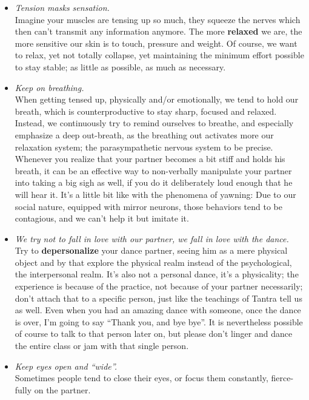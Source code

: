 \begin{itemize}
    \item [] \textit{Tension masks sensation.} \\
    Imagine your muscles are tensing up so much, they squeeze the nerves which then can't transmit any information anymore.
    The more \textbf{relaxed} we are, the more sensitive our skin is to touch, pressure and weight.
    Of course, we want to relax, yet not totally collapse, yet maintaining the minimum effort possible to stay stable; as little as possible, as much as necessary.
    \item [] \textit{Keep on breathing.} \\
    When getting tensed up, physically and/or emotionally, we tend to hold our breath, which is counterproductive to stay sharp, focused and relaxed.
    Instead, we continuously try to remind ourselves to breathe, and especially emphasize a deep out-breath, as the breathing out activates more our relaxation system; the parasympathetic nervous system to be precise.
    Whenever you realize that your partner becomes a bit stiff and holds his breath, it can be an effective way to non-verbally manipulate your partner into taking a big sigh as well, if you do it deliberately loud enough that he will hear it.
    It's a little bit like with the phenomena of yawning: Due to our social nature, equipped with mirror neurons, those behaviors tend to be contagious, and we can't help it but imitate it.
    \item [] \textit{We try not to fall in love with our partner, we fall in love with the dance.} \\
    Try to \textbf{depersonalize} your dance partner, seeing him as a mere physical object and by that explore the physical realm instead of the psychological, the interpersonal realm.
    It's also not a personal dance, it's a physicality; the experience is because of the practice, not because of your partner necessarily; don't attach that to a specific person, just like the teachings of Tantra tell us as well.
    Even when you had an amazing dance with someone, once the dance is over, I'm going to say ``Thank you, and bye bye''.
    It is nevertheless possible of course to talk to that person later on, but please don't linger and dance the entire class or jam with that single person.
    \item [] \textit{Keep eyes open and ``wide''.} \\
    Sometimes people tend to close their eyes, or focus them constantly, fierce-fully on the partner.

\end{itemize}
